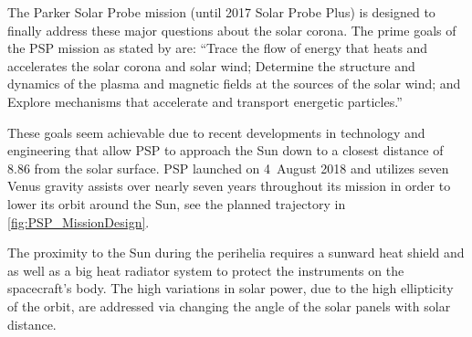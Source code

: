 The Parker Solar Probe mission (until 2017 Solar Probe Plus) is designed to finally address these major questions about the solar corona. The prime goals of the PSP mission as stated by \citet{Fox2015} are: ``Trace the flow of energy that heats and accelerates the solar corona and solar wind; Determine the structure and dynamics of the plasma and magnetic fields at the sources of the solar wind; and Explore mechanisms that accelerate and transport energetic particles.''

These goals seem achievable due to recent developments in technology and engineering that allow PSP to approach the Sun down to a closest distance of \SI{8.86}{\Rs} from the solar surface. PSP launched on 4~August 2018 and utilizes seven Venus gravity assists over nearly seven years throughout its mission in order to lower its orbit around the Sun, see the planned trajectory in \autoref{fig:PSP_MissionDesign}.
\begin{figure}
\end{figure}

The proximity to the Sun during the perihelia requires a sunward heat shield and as well as a big heat radiator system to protect the instruments on the spacecraft's body. The high variations in solar power, due to the high ellipticity of the orbit, are addressed via changing the angle of the solar panels with solar distance.

